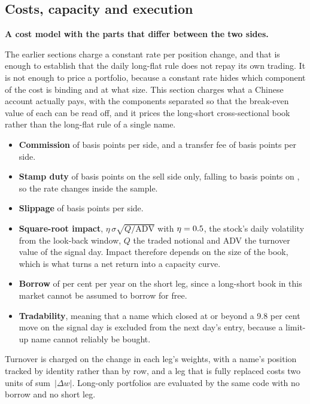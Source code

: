 \documentclass[pdflatex,sn-mathphys-ay]{sn-jnl}
\theoremstyle{thmstyleone}%
\theoremstyle{thmstyletwo}%
\theoremstyle{thmstyletwo}%
\begin{document}
\subsection{Costs, capacity and execution}
\textbf{A cost model with the parts that differ between the two sides.}

The earlier sections charge a constant rate per position change, and that is enough to establish that
the daily long-flat rule does not repay its own trading. It is not enough to price a portfolio, because
a constant rate hides which component of the cost is binding and at what size. This section charges
what a Chinese account actually pays, with the components separated so that the break-even value of
each can be read off, and it prices the long-short cross-sectional book rather than the long-flat rule
of a single name.

\begin{itemize}
	\item \textbf{Commission} of \commissionBp{} basis points per side, and a transfer fee of
	\transferBp{} basis points per side.
	\item \textbf{Stamp duty} of \stampBeforeBp{} basis points on the sell side only, falling to
	\stampAfterBp{} basis points on \stampDate, so the rate changes inside the sample.
	\item \textbf{Slippage} of \slippageBp{} basis points per side.
	\item \textbf{Square-root impact}, $\eta\,\sigma\sqrt{Q/\text{ADV}}$ with $\eta = 0.5$,
	the stock's daily volatility from the look-back window, $Q$ the traded notional and ADV the
	turnover value of the signal day. Impact therefore depends on the size of the book, which is what
	turns a net return into a capacity curve.
	\item \textbf{Borrow} of \borrowPct{} per cent per year on the short leg, since a long-short book
	in this market cannot be assumed to borrow for free.
	\item \textbf{Tradability}, meaning that a name which closed at or beyond a 9.8 per cent move on the
	signal day is excluded from the next day's entry, because a limit-up name cannot reliably be bought.
\end{itemize}

Turnover is charged on the change in each leg's weights, with a name's position tracked by identity
rather than by row, and a leg that is fully replaced costs two units of \mbox{sum~$|\Delta w|$}. Long-only portfolios are
evaluated by the same code with no borrow and no short leg.
\end{document}
